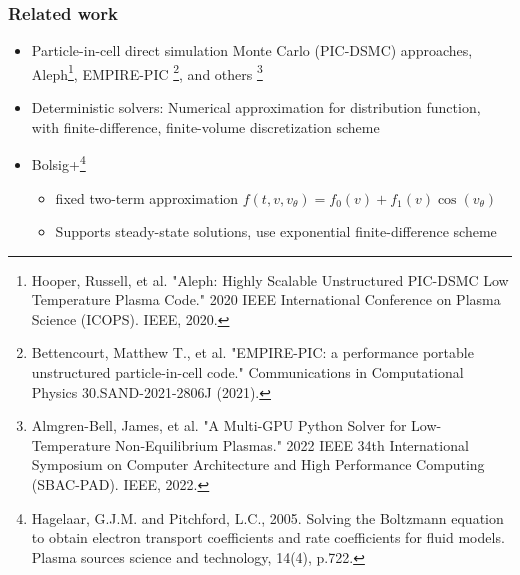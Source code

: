 \documentclass[mathserif, aspectratio=169]{beamer}
\newcommand{\vtheta}{{v_{\theta}}}
\begin{document}
\begin{frame}
	\frametitle{Related work}
	\begin{itemize}
		\item Particle-in-cell direct simulation Monte Carlo (PIC-DSMC) approaches, Aleph\footnote[frame]{\tiny Hooper, Russell, et al. "Aleph: Highly Scalable Unstructured PIC-DSMC Low Temperature Plasma Code." 2020 IEEE International Conference on Plasma Science (ICOPS). IEEE, 2020.}, EMPIRE-PIC \footnote[frame]{\tiny Bettencourt, Matthew T., et al. "EMPIRE-PIC: a performance portable unstructured particle-in-cell code." Communications in Computational Physics 30.SAND-2021-2806J (2021).}, and others \footnote[frame]{ \tiny Almgren-Bell, James, et al. "A Multi-GPU Python Solver for Low-Temperature Non-Equilibrium Plasmas." 2022 IEEE 34th International Symposium on Computer Architecture and High Performance Computing (SBAC-PAD). IEEE, 2022.}
		\item Deterministic solvers: Numerical approximation for distribution function, with finite-difference, finite-volume discretization scheme
		\item Bolsig+\footnote[frame]{\tiny Hagelaar, G.J.M. and Pitchford, L.C., 2005. Solving the Boltzmann equation to obtain electron transport coefficients and rate coefficients for fluid models. Plasma sources science and technology, 14(4), p.722.}
		\begin{itemize}
			\item fixed two-term approximation $f(t, v, \vtheta) = f_0(v) + f_1(v) \cos(\vtheta)$
			\item Supports steady-state solutions, use exponential finite-difference scheme
		\end{itemize}
	\end{itemize}
\end{frame}
\end{document}
